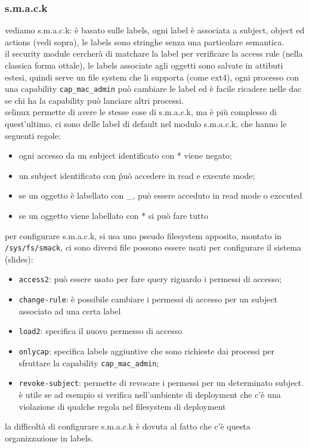 \documentclass[12pt, oneside]{extbook} %
\begin{document}
\subsubsection{s.m.a.c.k}
vediamo s.m.a.c.k: è basato sulle labels, ogni label è associata a subject, object ed actions (vedi sopra), le labels sono stringhe senza una particolare semantica.\\il security module cercherà di matchare la label per verificare la access rule (nella classica forma ottale), le labels associate agli oggetti sono salvate in attibuti estesi, quindi serve un file system che li supporta (come ext4), ogni processo con una capability \texttt{cap\_mac\_admin} può cambiare le label ed è facile ricadere nelle dac se chi ha la capability può lanciare altri processi.\\selinux permette di avere le stesse cose di s.m.a.c.k, ma è più complesso di quest'ultimo. ci sono delle label di default nel modulo s.m.a.c.k, che hanno le seguenti regole:
\begin{itemize}
\item ogni accesso da un subject identificato con * viene negato;
\item un subject identificato con \^ può accedere in read e execute mode;
\item se un oggetto è labellato con \_, può essere acceduto in read mode o executed
\item se un oggetto viene labellato con * si può fare tutto
\end{itemize}
per configurare s.m.a.c.k, si usa uno pseudo filesystem apposito, montato in \texttt{/sys/fs/smack}, ci sono diversi file  possono essere usati per configurare il sistema (slides):
\begin{itemize}
\item \texttt{access2}: può essere usato per fare query riguardo i permessi di accesso;
\item \texttt{change-rule}: è possibile cambiare i permessi di accesso per un subject associato ad una certa label
\item \texttt{load2}: specifica il nuovo permesso di accesso
\item \texttt{onlycap}: specifica labels aggiuntive che sono richieste dai processi per sfruttare la capability \texttt{cap\_mac\_admin};
\item \texttt{revoke-subject}: permette di revocare i permessi per un determinato subject. è utile se ad esempio si verifica nell'ambiente di deployment che c'è una violazione di qualche regola nel filesystem di deployment
\end{itemize}
la difficoltà di configurare s.m.a.c.k è dovuta al fatto che c'è questa organizzazione in labels.
\end{document}
